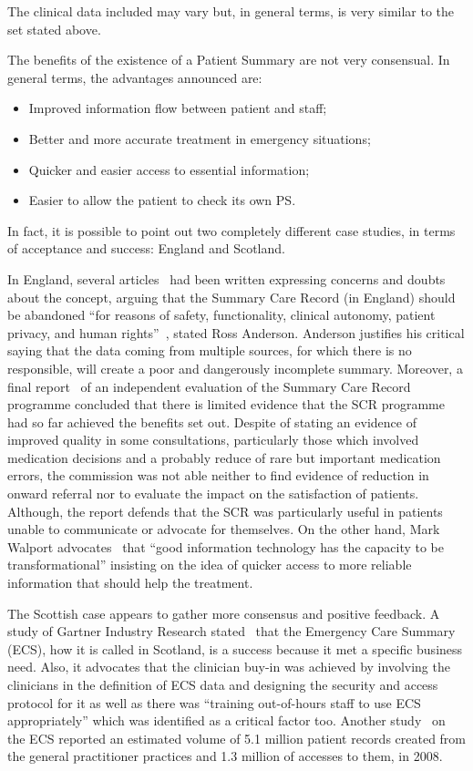 The clinical data included may vary but, in general terms, is very similar to the set stated above. 

The benefits of the existence of a Patient Summary are not very consensual. In general terms, the advantages announced are:
\begin{itemize}
\item Improved information flow between patient and staff;
\item Better and more accurate treatment in emergency situations;
\item Quicker and easier access to essential information;
\item Easier to allow the patient to check its own PS.
\end{itemize}

In fact, it is possible to point out two completely different case studies, in terms of acceptance and success: England and Scotland. 

In England, several articles~\citep{Anderson2010, Coiera2011, Greenhalgh2010} had been written expressing concerns and doubts about the concept, arguing that the Summary Care Record (in England) should be abandoned ``for reasons of safety, functionality, clinical autonomy, patient privacy, and human rights''~\citep{Anderson2010}, stated Ross Anderson. Anderson justifies his critical saying that the data coming from multiple sources, for which there is no responsible, will create a poor and dangerously incomplete summary. Moreover, a final report~\citep{Stramer2010} of an independent evaluation of the Summary Care Record programme concluded that there is limited evidence that the SCR programme had so far achieved the benefits set out. Despite of stating an evidence of improved quality in some consultations, particularly those which involved medication decisions and a probably reduce of rare but important medication errors, the commission was not able neither to find evidence of reduction in onward referral nor to evaluate the impact on the satisfaction of patients. Although, the report defends that the SCR was particularly useful in patients unable to communicate or advocate for themselves. On the other hand, Mark Walport advocates~\citep{Walport2010} that ``good information technology has the capacity to be transformational'' insisting on the idea of quicker access to more reliable information that should help the treatment.

The Scottish case appears to gather more consensus and positive feedback. A study of Gartner Industry Research stated~\citep{Research2007} that the Emergency Care Summary (ECS), how it is called in Scotland, is a success because it met a specific business need. Also, it advocates that the clinician buy-in was achieved by involving the clinicians in the definition of ECS data and designing the security and access protocol for it as well as there was ``training out-of-hours staff to use ECS appropriately'' which was identified as a critical factor too. Another study~\citep{Jones2008} on the ECS reported an estimated volume of 5.1 million patient records created from the general practitioner practices and 1.3 million of accesses to them, in 2008.

